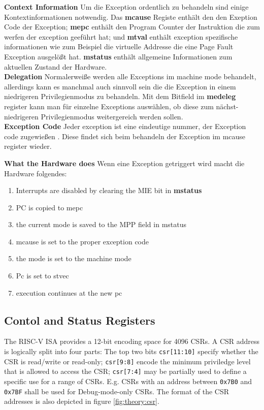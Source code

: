 \textbf{Context Information} Um die Exception ordentlich zu behandeln sind einige
Kontextinformationen notwendig. Das \textbf{mcause} Registe enthält den den Exeption Code
der Exception; \textbf{mepc} enthält den Program Counter der Instruktion die zum werfen der
exception geeführt hat; und \textbf{mtval} enthält exception spezifische informationen wie
zum Beispiel die virtuelle Addresse die eine Page Fault Exception ausgelößt hat.
\textbf{mstatus} enthält allgemeine Informationen zum aktuellen Zustand der Hardware.\\

\textbf{Delegation} Normalerweiße werden alle Exceptions im machine mode behandelt, allerdings
kann es manchmal auch sinnvoll sein die die Exception in einem niedrigeren Privilegienmodus
zu behandeln. Mit dem Bitfield im \textbf{medeleg} register kann man für einzelne Exceptions
auswählen, ob diese zum nächst-niedrigeren Privilegienmodus weitergereich werden sollen.\\

\textbf{Exception Code} Jeder exception ist eine eindeutige nummer, der Exception code zugewießen
\cite{riscvreader}. Diese findet sich beim behandeln der Exception im mcause register wieder.


\textbf{What the Hardware does} Wenn eine Exception getriggert wird macht die Hardware folgendes:
\begin{enumerate}
    \item Interrupts are disabled by clearing the MIE bit in \textbf{mstatus}
    \item PC is copied to mepc
    \item the current mode is saved to the MPP field in mstatus
    \item mcause is set to the proper exception code
    \item the mode is set to the machine mode
    \item Pc is set to stvec
    \item execution continues at the new pc
\end{enumerate}

\subsection{Contol and Status Registers}
The RISC-V ISA provides a 12-bit encoding space for 4096 CSRs. A CSR address is logically split
into four parts: The top two bits \texttt{csr[11:10]} specify whether the CSR is read/write or read-only;
\texttt{csr[9:8]} encode the minimum priviledge level that is allowed to access the CSR; \texttt{csr[7:4]}
may be partially used to define a specific use for a range of CSRs. E.g. CSRs with an address
between \texttt{0x7B0} and \texttt{0x7BF} shall be used for Debug-mode-only CSRs. The format
of the CSR addresses is also depicted in figure \ref{fig:theory:csr}.

